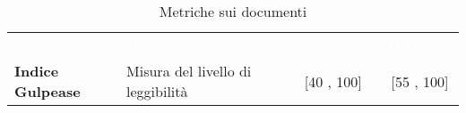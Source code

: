 \begin{table}[H]
	\renewcommand{\arraystretch}{1.5}
	\centering
	\begin{tabular}{C{4cm} C{5cm} c c}
	
	\textcolor{white}{\textbf{Nome}} &
	\textcolor{white}{\textbf{Descrizione}} &
	\textcolor{white}{\textbf{Accettabile}} &
	\textcolor{white}{\textbf{Ottimale}}\\
	
	\textbf{Indice Gulpease} &
	Misura del livello di leggibilità &
	[40 , 100] &
	[55 , 100]\\
	
	
	\end{tabular}
	\caption{Metriche sui documenti}
\end{table}
